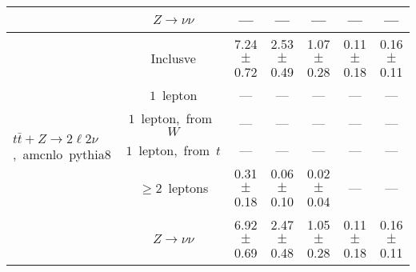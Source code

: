 \documentclass{article}
\begin{document}
\begin{longtable}{|l|c|c|c|c|c|c|}
 & $Z\rightarrow\nu\nu$  & ---  & ---  & ---  & ---  & --- \\* 
\hline 
\multirow{6}{*}{$t\bar{t}+Z{\rightarrow}2{\ell}2{\nu}$,~amcnlo~pythia8} & Inclusve  & 7.24 $\pm$ 0.72  & 2.53 $\pm$ 0.49  & 1.07 $\pm$ 0.28  & 0.11 $\pm$ 0.18  & 0.16 $\pm$ 0.11 \\* 
 & $1$~lepton  & ---  & ---  & ---  & ---  & --- \\* 
 & $1$~lepton,~from~$W$  & ---  & ---  & ---  & ---  & --- \\* 
 & $1$~lepton,~from~$t$  & ---  & ---  & ---  & ---  & --- \\* 
 & $\ge2$~leptons  & 0.31 $\pm$ 0.18  & 0.06 $\pm$ 0.10  & 0.02 $\pm$ 0.04  & ---  & --- \\* 
 & $Z\rightarrow\nu\nu$  & 6.92 $\pm$ 0.69  & 2.47 $\pm$ 0.48  & 1.05 $\pm$ 0.28  & 0.11 $\pm$ 0.18  & 0.16 $\pm$ 0.11 \\* 
\hline 
\end{longtable} 

 
 
 
 
\pagebreak 

 
 
 
 
\end{document}
